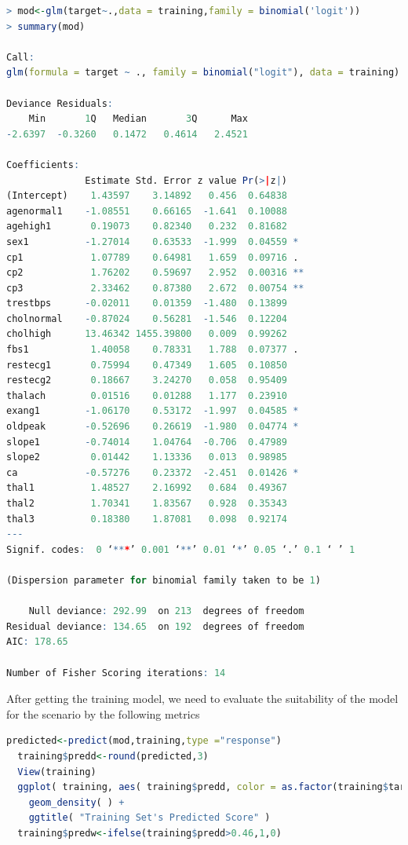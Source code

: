 \documentclass{article}
\begin{document}
\begin{lstlisting}[language=R]
> mod<-glm(target~.,data = training,family = binomial('logit'))
> summary(mod)

Call:
glm(formula = target ~ ., family = binomial("logit"), data = training)

Deviance Residuals: 
    Min       1Q   Median       3Q      Max  
-2.6397  -0.3260   0.1472   0.4614   2.4521  

Coefficients:
              Estimate Std. Error z value Pr(>|z|)   
(Intercept)    1.43597    3.14892   0.456  0.64838   
agenormal1    -1.08551    0.66165  -1.641  0.10088   
agehigh1       0.19073    0.82340   0.232  0.81682   
sex1          -1.27014    0.63533  -1.999  0.04559 * 
cp1            1.07789    0.64981   1.659  0.09716 . 
cp2            1.76202    0.59697   2.952  0.00316 **
cp3            2.33462    0.87380   2.672  0.00754 **
trestbps      -0.02011    0.01359  -1.480  0.13899   
cholnormal    -0.87024    0.56281  -1.546  0.12204   
cholhigh      13.46342 1455.39800   0.009  0.99262   
fbs1           1.40058    0.78331   1.788  0.07377 . 
restecg1       0.75994    0.47349   1.605  0.10850   
restecg2       0.18667    3.24270   0.058  0.95409   
thalach        0.01516    0.01288   1.177  0.23910   
exang1        -1.06170    0.53172  -1.997  0.04585 * 
oldpeak       -0.52696    0.26619  -1.980  0.04774 * 
slope1        -0.74014    1.04764  -0.706  0.47989   
slope2         0.01442    1.13336   0.013  0.98985   
ca            -0.57276    0.23372  -2.451  0.01426 * 
thal1          1.48527    2.16992   0.684  0.49367   
thal2          1.70341    1.83567   0.928  0.35343   
thal3          0.18380    1.87081   0.098  0.92174   
---
Signif. codes:  0 ‘***’ 0.001 ‘**’ 0.01 ‘*’ 0.05 ‘.’ 0.1 ‘ ’ 1

(Dispersion parameter for binomial family taken to be 1)

    Null deviance: 292.99  on 213  degrees of freedom
Residual deviance: 134.65  on 192  degrees of freedom
AIC: 178.65

Number of Fisher Scoring iterations: 14
\end{lstlisting} 
After getting the training model, we need to evaluate the suitability of the model for the scenario by the following metrics
\begin{lstlisting}[language=R]
  predicted<-predict(mod,training,type ="response")
  training$predd<-round(predicted,3)
  View(training)
  ggplot( training, aes( training$predd, color = as.factor(training$target) ) ) + 
    geom_density( ) +
    ggtitle( "Training Set's Predicted Score" )
  training$predw<-ifelse(training$predd>0.46,1,0)
\end{lstlisting}
\end{document}
